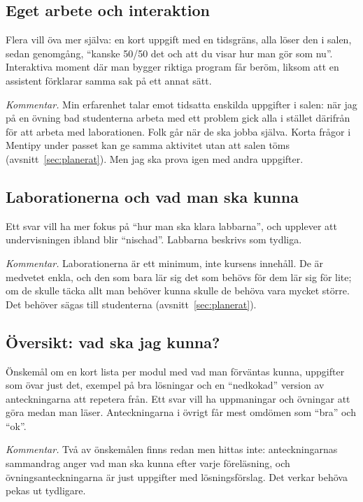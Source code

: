 \documentclass[a4paper]{article}
\begin{document}
\begin{refsection}
\subsection{Eget arbete och interaktion}

Flera vill öva mer själva: en kort uppgift med en tidsgräns, alla löser
den i salen, sedan genomgång, \enquote{kanske 50/50 det och att du visar
hur man gör som nu}. Interaktiva moment där man bygger riktiga program
får beröm, liksom att en assistent förklarar samma sak på ett annat sätt.

\emph{Kommentar.} Min erfarenhet talar emot tidsatta enskilda uppgifter i
salen: när jag på en övning bad studenterna arbeta med ett problem gick
alla i stället därifrån för att arbeta med laborationen. Folk går när de
ska jobba själva. Korta frågor i Mentipy under passet kan ge samma
aktivitet utan att salen töms (avsnitt~\ref{sec:planerat}). Men jag ska
prova igen med andra uppgifter.

\subsection{Laborationerna och vad man ska kunna}

Ett svar vill ha mer fokus på \enquote{hur man ska klara labbarna}, och
upplever att undervisningen ibland blir \enquote{nischad}. Labbarna
beskrivs som tydliga.

\emph{Kommentar.} Laborationerna är ett minimum, inte kursens innehåll.
De är medvetet enkla, och den som bara lär sig det som behövs för dem lär
sig för lite; om de skulle täcka allt man behöver kunna skulle de behöva
vara mycket större. Det behöver sägas till studenterna
(avsnitt~\ref{sec:planerat}).

\subsection{Översikt: vad ska jag kunna?}\label{sec:oversikt}

Önskemål om en kort lista per modul med vad man förväntas kunna,
uppgifter som övar just det, exempel på bra lösningar och en
\enquote{nedkokad} version av anteckningarna att repetera från. Ett svar
vill ha uppmaningar och övningar att göra medan man läser. Anteckningarna
i övrigt får mest omdömen som \enquote{bra} och \enquote{ok}.

\emph{Kommentar.} Två av önskemålen finns redan men hittas inte:
anteckningarnas sammandrag anger vad man ska kunna efter varje
föreläsning, och övningsanteckningarna är just uppgifter med
lösningsförslag. Det verkar behöva pekas ut tydligare.


\end{refsection}
\end{document}
